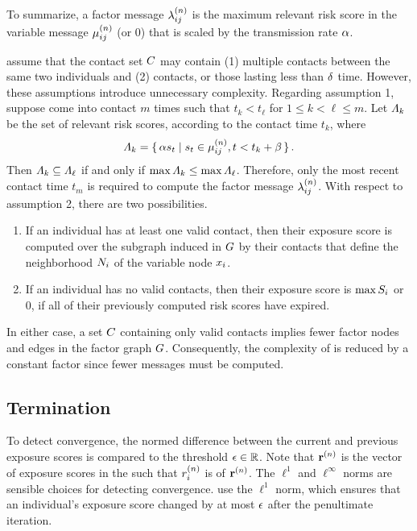 To summarize, a factor message $\lambda_{ij}^{(n)}$ is the maximum relevant risk score in the variable message $\mu_{ij}^{(n)}$ (or 0) that is scaled by the transmission rate $\alpha$.

\citet{Ayday2021} assume that the contact set $C$ may contain (1) multiple contacts between the same two individuals and (2)  contacts, or those lasting less than $\delta$ time. However, these assumptions introduce unnecessary complexity. Regarding assumption 1, suppose  come into contact $m$ times such that $t_k < t_\ell$ for $1 \leq k < \ell \leq m$. Let $\varLambda_k$ be the set of relevant risk scores, according to the contact time $t_k$, where
\begin{equation*}
  \varLambda_k = \set{ \alpha s_t | s_t \in \mu_{ij}^{(n)}, t < t_k + \beta}.
\end{equation*}
Then $\varLambda_k \subseteq \varLambda_\ell$ if and only if $\max \varLambda_k \leq \max \varLambda_\ell$. Therefore, only the most recent contact time $t_m$ is required to compute the factor message $\lambda_{ij}^{(n)}$. With respect to assumption 2, there are two possibilities.
\begin{enumerate}
  \item If an individual has at least one valid contact, then their exposure score is computed over the subgraph induced in $G$ by their contacts that define the neighborhood $N_i$ of the variable node $\vVariable_i$.
  \item If an individual has no valid contacts, then their exposure score is $\max S_i$ or $0$, if all of their previously computed risk scores have expired.
\end{enumerate}
In either case, a set $C$ containing only valid contacts implies fewer factor nodes and edges in the factor graph $G$. Consequently, the complexity of \cRiskPropagation{} is reduced by a constant factor since fewer messages must be computed.

\subsection{Termination}

To detect convergence, the normed difference between the current and previous exposure scores is compared to the threshold $\epsilon \in \mathbb{R}$. Note that $\mathbf{r}^{(n)}$ is the vector of exposure scores in the  such that $r_{i}^{(n)}$ is  of $\mathbf{r}^{(n)}$. The $\ell^1$ and $\ell^\infty$ norms are sensible choices for detecting convergence. \citet{Ayday2021} use the $\ell^1$ norm, which ensures that an individual's exposure score changed by at most $\epsilon$ after the penultimate iteration.

